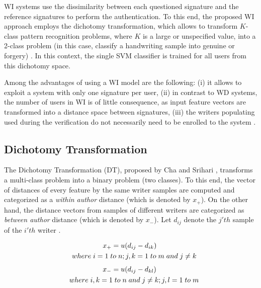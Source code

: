 \documentclass[conference]{IEEEtran}
\begin{document}
WI systems use the dissimilarity between each questioned signature and the reference signatures to perform the authentication. To this end, the proposed WI approach employs the dichotomy transformation, which allows to transform $K$-class pattern recognition problems, where $K$ is a large or unspecified value, into a 2-class problem (in this case, classify a handwriting sample into genuine or forgery) \cite{rivard:13}. In this context, the single SVM classifier is trained for all users from this dichotomy space.

Among the advantages of using a WI model are the following: (i) it allows to exploit a system with only one signature per user, (ii) in contrast to WD systems, the number of users in WI is of little consequence, as input feature vectors are transformed into a distance space between signatures, (iii) the writers populating used during the verification do not necessarily need to be enrolled to the system \cite{rivard:13}.

\subsection{Dichotomy Transformation}

The Dichotomy Transformation (DT), proposed by Cha and Srihari \cite{cha:00}, transforms a multi-class problem into a binary problem (two classes). 
To this end, the vector of distances of every feature by the same writer samples are computed and categorized as a \textit{within author} distance (which is denoted by $x_+$). On the other hand, the distance vectors from samples of different writers are categorized as \textit{between author} distance (which is denoted by $x_-$). Let $d_{ij}$ denote the $j'th$ sample of the $i'th$ writer \cite{cha:00}.


\vspace{-0.5cm}
\begin{multline}
x_+ = u(d_{ij} - d_{ik}) \; \\ 
\shoveleft where \; i = 1 \; to \; n; j,k = 1 \; to \; m \; and \; j \neq k
\end{multline}
\vspace{-0.5cm}
\begin{multline}
x_- = u(d_{ij} - d_{kl}) \; \\
\shoveleft where \; i, k = 1 \; to \; n \;  and \; j \neq k; j,l = 1 \; to \; m
\end{multline}
\end{document}
